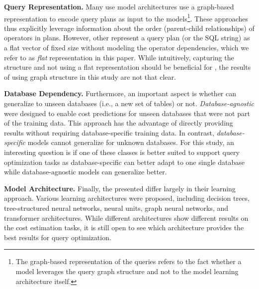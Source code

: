 \noindent \textbf{Query Representation.}
Many \lcms use model architectures use a graph-based representation to encode query plans as input to the models\footnote{The graph-based representation of the queries refers to the fact whether a model leverages the query graph structure and not to the model learning architecture itself.}.
These approaches thus explicitly leverage information about the order (parent-child relationships) of operators in plans.
However, other \lcms \cite{kipf2019, akdere2012} represent a query plan (or the SQL string) as a flat vector of fixed size without modeling the operator dependencies, which we refer to as \textit{flat} representation in this paper.
While intuitively, capturing the structure and not using a flat representation should be beneficial for \lcms, the results of using graph structure in this study are not that clear. 

\noindent \textbf{Database Dependency.}
Furthermore, an important aspect is whether \lcms can generalize to unseen databases (i.e., a new set of tables) or not.
\textit{Database-agnostic} \lcms were designed \cite{hilprecht2022, zibo_liang_dace_2024} to enable cost predictions for unseen databases that were not part of the training data.
This approach has the advantage of directly providing results without requiring database-specific training data. 
In contrast, \textit{database-specific} \cite{sun2019, zhao2022, marcus2019} models cannot generalize for unknown databases.
For this study, an interesting question is if one of these classes is better suited to support query optimization tasks as database-specific can better adapt to one single database while database-agnostic models can generalize better.

\noindent \textbf{Model Architecture.}
Finally, the presented \lcms differ largely in their learning approach.
Various learning architectures were proposed, including decision trees, tree-structured neural networks, neural units, graph neural networks, and transformer architectures.
While different architectures show different results on the cost estimation tasks, it is still open to see which architecture provides the best results for query optimization.
